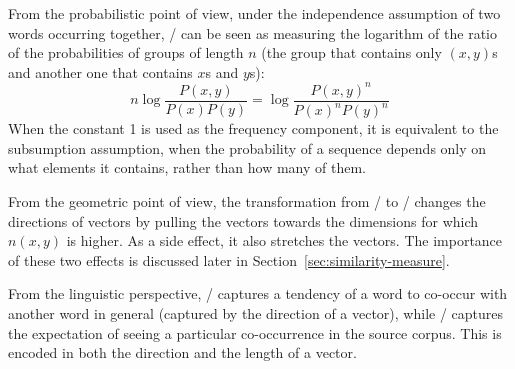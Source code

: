 

From the probabilistic point of view, under the independence assumption of two words occurring together, \NPMI/ can be seen as measuring the logarithm of the ratio of the probabilities of groups of length $n$ (the group that contains only $(x,y)$s and another one that contains $x$s and $y$s):
%
\begin{equation*}
  n\log\frac{P(x, y)}{P(x)P(y)} = \log\frac{P(x, y)^{n}}{P(x)^{n}P(y)^{n}}
\end{equation*}
%
When the constant 1 is used as the frequency component, it is equivalent to the subsumption assumption, when the probability of a sequence depends only on what elements it contains, rather than how many of them.

From the geometric point of view, the transformation from \PMI/ to \NPMI/ changes the directions of vectors by pulling the vectors towards the dimensions for which $n(x, y)$ is higher. As a side effect, it also stretches the vectors. The importance of these two effects is discussed later in Section~\ref{sec:similarity-measure}.

From the linguistic perspective, \PMI/ captures a tendency of a word to co-occur with another word in general (captured by the direction of a vector), while \NPMI/ captures the expectation of seeing a particular co-occurrence in the source corpus. This is encoded in both the direction and the length of a vector.

